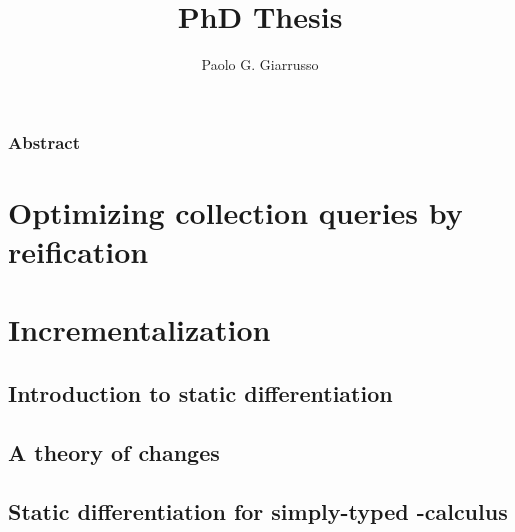 \documentclass{book}
\title{PhD Thesis}
\author{Paolo G. Giarrusso}
\begin{document}
\maketitle


\section*{Abstract}

\tableofcontents



\part{Optimizing collection queries by reification}
\label{sec:ch-aosd13}





\part{Incrementalization}
\label{part:incr}
\chapter{Introduction to static differentiation}


\chapter{A theory of changes}
%


\chapter{Static differentiation for simply-typed \TitleLambda{}-calculus}





% 
% 

%



\begin{oldSec}

\end{oldSec}
\end{document}
